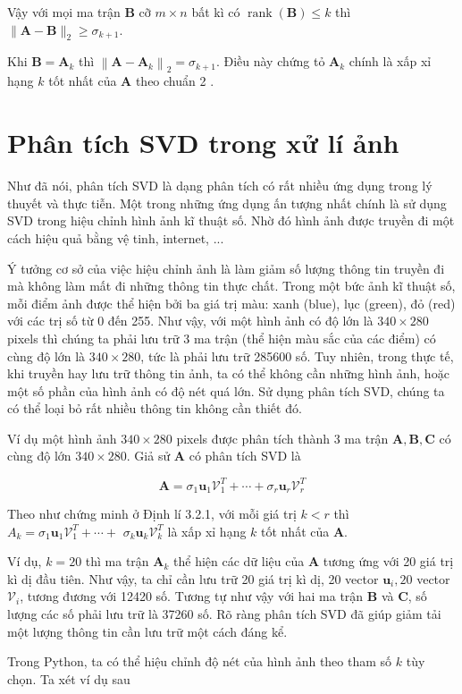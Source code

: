 \documentclass[12pt,a4paper,oneside]{report}
\numberwithin{equation}{section}
\begin{document}
Vậy với mọi ma trận $\mathbf{B}$ cỡ $m \times n$ bất kì có $\operatorname{rank}(\mathbf{B}) \leqslant k$ thì $\|\mathbf{A}-\mathbf{B}\|_{2} \geqslant \sigma_{k+1}$.

Khi $\mathbf{B}=\mathbf{A}_{k}$ thì $\left\|\mathbf{A}-\mathbf{A}_{k}\right\|_{2}=\sigma_{k+1}$. Điều này chứng tỏ $\mathbf{A}_{k}$ chính là xấp xỉ hạng $k$ tốt nhất của $\mathbf{A}$ theo chuẩn 2 . 

\section{Phân tích SVD trong xử lí ảnh}

Như đã nói, phân tích SVD là dạng phân tích có rất nhiều ứng dụng trong lý thuyết và thực tiễn. Một trong những ứng dụng ấn tượng nhất chính là sử dụng SVD trong hiệu chỉnh hình ảnh kĩ thuật số. Nhờ đó hình ảnh được truyền đi một cách hiệu quả bằng vệ tinh, internet, ...

Ý tưởng cơ sở của việc hiệu chỉnh ảnh là làm giảm số lượng thông tin truyền đi mà không làm mất đi những thông tin thực chất. Trong một bức ảnh kĩ thuật số, mỗi điểm ảnh được thể hiện bởi ba giá trị màu: xanh (blue), lục (green), đỏ (red) với các trị số từ 0 đến 255. Như vậy, với một hình ảnh có độ lớn là $340 \times 280$ pixels thì chúng ta phải lưu trữ 3 ma trận (thể hiện màu sắc của các điểm) có cùng độ lớn là $340 \times 280$, tức là phải lưu trữ 285600 số. Tuy nhiên, trong thực tế, khi truyền hay lưu trữ thông tin ảnh, ta có thể không cần những hình ảnh, hoặc một số phần của hình ảnh có độ nét quá lớn. Sử dụng phân tích SVD, chúng ta có thể loại bỏ rất nhiều thông tin không cần thiết đó.

Ví dụ một hình ảnh $340 \times 280$ pixels được phân tích thành 3 ma trận $\mathbf{A}, \mathbf{B}, \mathbf{C}$ có cùng độ lớn $340 \times 280$. Giả sử $\mathbf{A}$ có phân tích SVD là

$$
\mathbf{A}=\sigma_{1} \mathbf{u}_{1} \mathcal{V}_{1}^{T}+\cdots+\sigma_{r} \mathbf{u}_{r} \mathcal{V}_{r}^{T}
$$

Theo như chứng minh ở Định lí 3.2.1, với mỗi giá trị $k<r$ thì $A_{k}=\sigma_{1} \mathbf{u}_{1} \mathcal{V}_{1}^{T}+\cdots+$ $\sigma_{k} \mathbf{u}_{k} \mathcal{V}_{k}^{T}$ là xấp xỉ hạng $k$ tốt nhất của $\mathbf{A}$.

Ví dụ, $k=20$ thì ma trận $\mathbf{A}_{k}$ thể hiện các dữ liệu của $\mathbf{A}$ tương ứng với 20 giá trị kì dị đầu tiên. Như vậy, ta chỉ cần lưu trữ 20 giá trị kì dị, 20 vector $\mathbf{u}_{i}, 20$ vector $\mathcal{V}_{i}$, tương đương với 12420 số. Tương tự như vậy với hai ma trận $\mathbf{B}$ và $\mathbf{C}$, số lượng các số phải lưu trữ là 37260 số. Rõ ràng phân tích SVD đã giúp giảm tải một lượng thông tin cần lưu trữ một cách đáng kể.

Trong  Python, ta có thể hiệu chỉnh độ nét của hình ảnh theo tham số $k$ tùy chọn. Ta xét ví dụ sau 
\end{document}
